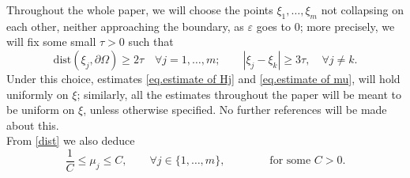 \documentclass[11pt]{article}
\begin{document}
Throughout the whole paper, we will choose the points $\xi_1,\dots,\xi_m$ not collapsing on each other, neither approaching the boundary, as $\varepsilon$ goes to $0$; more precisely, we will fix some small $\tau>0$ such that
\begin{equation}\label{dist}
\mathrm{dist}(\xi_j,\partial\Omega)\ge2\tau\quad\forall j=1,\dots,m;\qquad|\xi_j-\xi_k|\ge3\tau,\quad\forall j\ne k.
\end{equation}
Under this choice, estimates \eqref{eq.estimate of Hj} and \eqref{eq.estimate of mu}, will hold uniformly on $\xi$; similarly, all the estimates throughout the paper will be meant to be uniform on $\xi$, unless otherwise specified. No further references will be made about this.\\
From \eqref{dist} we also deduce
$$\frac1C\le\mu_j\le C,\qquad\forall j\in\{1,\dots,m\},\qquad\qquad\text{for some }C>0.$$\
\end{document}
